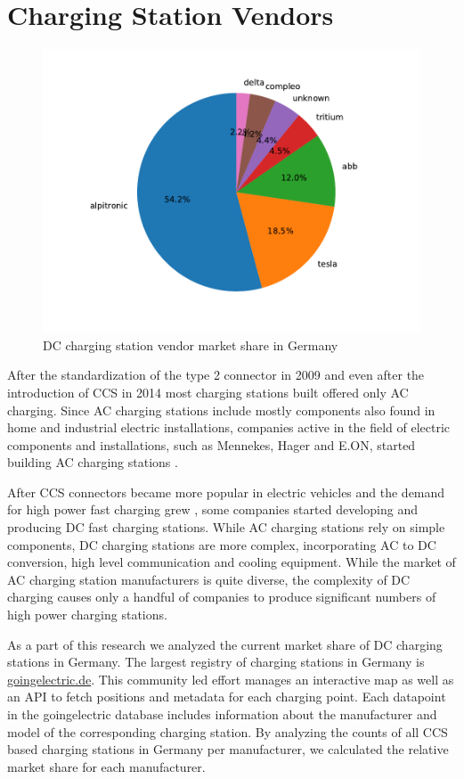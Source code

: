 \documentclass[conference,flushend]{iaria} %
\begin{document}



\section{Charging Station Vendors} \label{sec:chargingstationvendors}
\begin{figure}[ht]
    \centering
    \includegraphics[width=.489\textwidth]{graphs/market_analysis.pdf}
    \caption{DC charging station vendor market share in Germany}
    \label{fig:marketshare}
\end{figure}

After the standardization of the type 2 connector in 2009 and even after the introduction of CCS in 2014 most charging stations built offered only AC charging.
Since AC charging stations include mostly components also found in home and industrial electric installations, companies active in the field of electric components and installations, such as Mennekes, Hager and E.ON, started building AC charging stations \cite{dalheimer_ladeinfrastruktur_2017}.

After CCS connectors became more popular in electric vehicles and the demand for high power fast charging grew \cite{das_electric_2020}, some companies started developing and producing DC fast charging stations.
While AC charging stations rely on simple components, DC charging stations are more complex, incorporating AC to DC conversion, high level communication and cooling equipment.
While the market of AC charging station manufacturers is quite diverse, the complexity of DC charging causes only a handful of companies to produce significant numbers of high power charging stations.

As a part of this research we analyzed the current market share of DC charging stations in Germany.
The largest registry of charging stations in Germany is \url{goingelectric.de}. This community led effort manages an interactive map as well as an API to fetch positions and metadata for each charging point.
Each datapoint in the goingelectric database includes information about the manufacturer and model of the corresponding charging station.
By analyzing the counts of all CCS based charging stations in Germany per manufacturer, we calculated the relative market share for each manufacturer.
\end{document}

